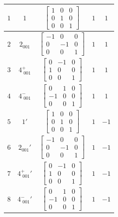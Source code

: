 \documentclass[fleqn,8pt]{jsarticle}
\begin{document}
\begin{longtable}{ccccc}
$ 1 $ & $ 1 $ & $ \begin{bmatrix} 1 & 0 & 0 \\ 0 & 1 & 0 \\ 0 & 0 & 1 \end{bmatrix} $ & $ 1 $ & $ 1 $ \\ \hline
$ 2 $ & $ 2{}_{001} $ & $ \begin{bmatrix} -1 & 0 & 0 \\ 0 & -1 & 0 \\ 0 & 0 & 1 \end{bmatrix} $ & $ 1 $ & $ 1 $ \\ \hline
$ 3 $ & $ 4^{+}_{\,\,001} $ & $ \begin{bmatrix} 0 & -1 & 0 \\ 1 & 0 & 0 \\ 0 & 0 & 1 \end{bmatrix} $ & $ 1 $ & $ 1 $ \\ \hline
$ 4 $ & $ 4^{-}_{\,\,001} $ & $ \begin{bmatrix} 0 & 1 & 0 \\ -1 & 0 & 0 \\ 0 & 0 & 1 \end{bmatrix} $ & $ 1 $ & $ 1 $ \\ \hline
$ 5 $ & $ 1{}' $ & $ \begin{bmatrix} 1 & 0 & 0 \\ 0 & 1 & 0 \\ 0 & 0 & 1 \end{bmatrix} $ & $ 1 $ & $ -1 $ \\ \hline
$ 6 $ & $ 2{}_{001}{}' $ & $ \begin{bmatrix} -1 & 0 & 0 \\ 0 & -1 & 0 \\ 0 & 0 & 1 \end{bmatrix} $ & $ 1 $ & $ -1 $ \\ \hline
$ 7 $ & $ 4^{+}_{\,\,001}{}' $ & $ \begin{bmatrix} 0 & -1 & 0 \\ 1 & 0 & 0 \\ 0 & 0 & 1 \end{bmatrix} $ & $ 1 $ & $ -1 $ \\ \hline
$ 8 $ & $ 4^{-}_{\,\,001}{}' $ & $ \begin{bmatrix} 0 & 1 & 0 \\ -1 & 0 & 0 \\ 0 & 0 & 1 \end{bmatrix} $ & $ 1 $ & $ -1 $ \\
\end{longtable}
\end{document}
